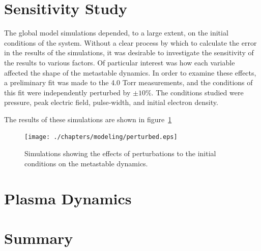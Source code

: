 \section{Sensitivity Study}

The global model simulations depended, to a large extent, on the initial
conditions of the system. Without a clear process by which to calculate the
error in the results of the simulations, it was desirable to investigate the
sensitivity of the results to various factors. Of particular interest was how
each variable affected the shape of the metastable dynamics. In order to examine
these effects, a preliminary fit was made to the 4.0 Torr measurements, and the
conditions of this fit were independently perturbed by $\pm10\%$. The conditions
studied were pressure, peak electric field, pulse-width, and initial electron
density.

The results of these simulations are shown in figure~\ref{fig:perturbed}
\begin{figure}
  \centering
  \texttt{[image: ./chapters/modeling/perturbed.eps]}
  \caption{Simulations showing the effects of perturbations to the initial
  conditions on the metastable dynamics.}
  \label{fig:perturbed}
\end{figure}


\section{Plasma Dynamics}



\section{Summary}


